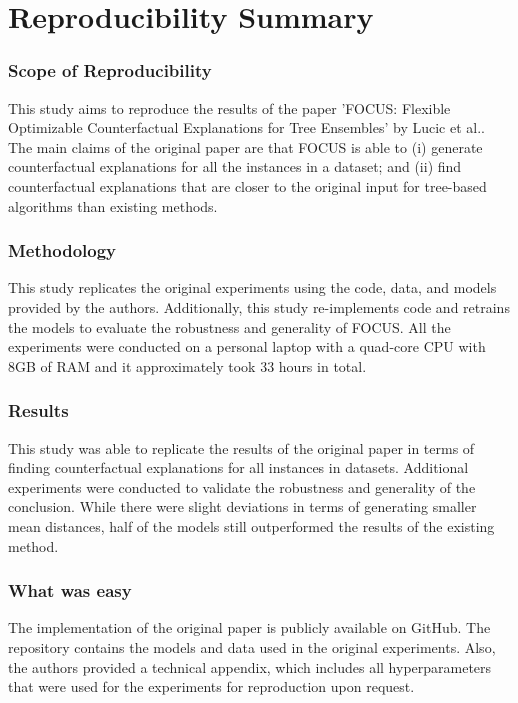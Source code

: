 \section*{\centering Reproducibility Summary}
\subsubsection*{Scope of Reproducibility}

This study aims to reproduce the results of the paper 'FOCUS: Flexible Optimizable Counterfactual Explanations for Tree Ensembles' by Lucic et al.\cite{lucic2022focus}.
The main claims of the original paper are that FOCUS is able to (i) generate counterfactual explanations for all the instances in a dataset; 
and (ii) find counterfactual explanations that are closer to the original input for tree-based algorithms than existing methods.

\subsubsection*{Methodology}
This study replicates the original experiments using the code, data, and models provided by the authors. Additionally, this study re-implements code and retrains the models to evaluate the robustness and generality of FOCUS.
All the experiments were conducted on a personal laptop with a quad-core CPU with 8GB of RAM and it approximately took 33 hours in total.

\subsubsection*{Results}
This study was able to replicate the results of the original paper in terms of finding counterfactual explanations for all instances in datasets. Additional experiments were conducted to validate the robustness and generality of the conclusion. While there were slight deviations in terms of generating smaller mean distances, half of the models still outperformed the results of the existing method.

\subsubsection*{What was easy}
The implementation of the original paper is publicly available on GitHub. The repository contains the models and data used in the original experiments. Also, the authors provided a technical appendix, which includes all hyperparameters that were used for the experiments for reproduction upon request. 

